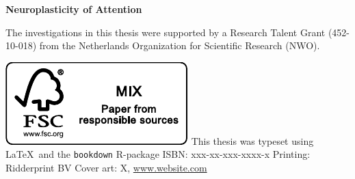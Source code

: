 
\thispagestyle{empty}
{\pagestyle{empty} 


\clearpage %
\null
\newpage

\vspace*{2cm}
\begin{center}
\Huge\textbf{Neuroplasticity of Attention} %
\end{center}

\clearpage
\vspace*{\fill}
\begingroup %
\small
\setlength{\parskip}{\baselineskip} %
\setlength\parindent{0pt} %
The investigations in this thesis were supported by 
a Research Talent Grant (452-10-018)  %
from 
the Netherlands Organization for Scientific Research (NWO). %

\includegraphics{_bookdown_files/FSC.pdf} \newline
This thesis was typeset using \LaTeX\ and the \verb+bookdown+ R-package \newline
ISBN: xxx-xx-xxx-xxxx-x \newline %
Printing: Ridderprint BV \newline %
Cover art: X, \url{www.website.com} %

}
